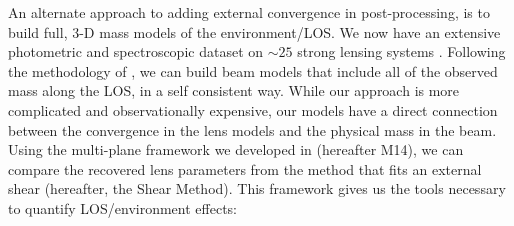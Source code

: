 An alternate approach to adding external convergence in post-processing, is to build full, 3-D mass models of the environment/LOS.  We now have an extensive photometric and spectroscopic dataset on $\sim25$ strong lensing systems \citep{Momcheva06,Williams08,Wong11,Momcheva15}. Following the methodology of \citet{Wong11}, we can build beam models that include all of the observed mass along the LOS, in a self consistent way.  While our approach is more complicated and observationally expensive, our models have a direct connection between the convergence in the lens models and the physical mass in the beam. Using the multi-plane framework we developed in \citet{McCully14} (hereafter M14), we can compare the recovered lens parameters from the method that fits an external shear (hereafter, the Shear Method). This framework gives us the tools necessary to quantify LOS/environment effects:
